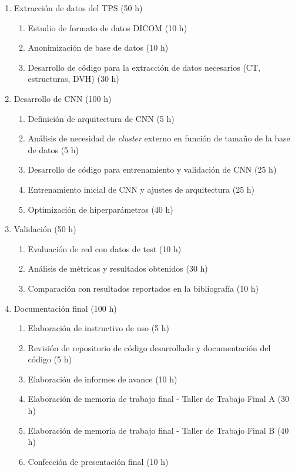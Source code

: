 \documentclass[
11pt, %
codirector, %
]{charter}
\begin{document}
\begin{enumerate}
\begin{enumerate}
	\end{enumerate}
\newpage 
\item Extracción de datos del TPS (50 h)
	\begin{enumerate}
	\item Estudio de formato de datos DICOM (10 h)
	\item Anonimización de base de datos (10 h)
	\item Desarrollo de código para la extracción de datos necesarios (CT, estructuras, DVH) (30 h)
	\end{enumerate}
\item Desarrollo de CNN (100 h)
	\begin{enumerate}
	\item Definición de arquitectura de CNN (5 h)
	\item Análisis de necesidad de \textit{cluster} externo en función de tamaño de la base de datos (5 h)
	\item Desarrollo de código para entrenamiento y validación de CNN (25 h)
	\item Entrenamiento inicial de CNN y ajustes de arquitectura (25 h)
	\item Optimización de hiperparámetros (40 h)
	\end{enumerate}
\item Validación (50 h)
	\begin{enumerate}
	\item Evaluación de red con datos de test (10 h)
	\item Análisis de métricas y resultados obtenidos (30 h)
	\item Comparación con resultados reportados en la bibliografía (10 h)
	\end{enumerate}
\item Documentación final (100 h)
	\begin{enumerate}
	\item Elaboración de instructivo de uso (5 h)
	\item Revisión de repositorio de código desarrollado y documentación del código (5 h)
	\item Elaboración de informes de avance (10 h)
	\item Elaboración de memoria de trabajo final - Taller de Trabajo Final A (30 h)
	\item Elaboración de memoria de trabajo final - Taller de Trabajo Final B (40 h)
	\item Confección de presentación final (10 h)
	\end{enumerate}
\end{enumerate}
\end{document}
